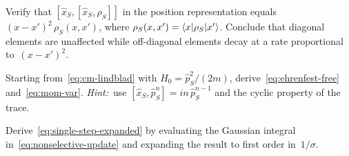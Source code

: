 \begin{exercise}\label{ex:double-comm-dephasing}
  Verify that $[\hat{x}_S, [\hat{x}_S, \rho_S]]$ in the position
  representation equals $(x - x')^2\,\rho_S(x,x')$, where
  $\rho_S(x,x') = \langle x \rvert\rho_S\lvert x' \rangle$.  Conclude that diagonal
  elements are unaffected while off-diagonal elements decay at a
  rate proportional to~$(x - x')^2$.
\end{exercise}

\begin{exercise}\label{ex:momentum-diffusion}
  Starting from~\eqref{eq:cm-lindblad} with
  $H_0 = \hat{p}_S^2/(2m)$,
  derive~\eqref{eq:ehrenfest-free} and~\eqref{eq:mom-var}.
  \emph{Hint:}\ use $[\hat{x}_S, \hat{p}_S^n] = in\,\hat{p}_S^{n-1}$
  and the cyclic property of the trace.
\end{exercise}

\begin{exercise}\label{ex:gauss-identity}
  Derive~\eqref{eq:single-step-expanded} by evaluating the
  Gaussian integral in~\eqref{eq:nonselective-update} and expanding
  the result to first order in~$1/\sigma$.
\end{exercise}
